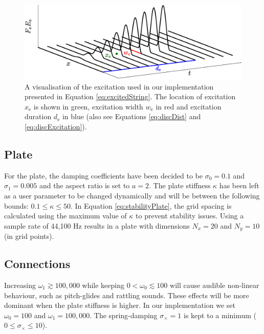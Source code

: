 \documentclass{article}
\begin{document}
\begin{figure}[h]
\centering
\includegraphics[width=1.0\columnwidth]{excitation.eps}
\caption{A visualisation of the excitation used in our implementation presented in Equation \eqref{eq:excitedString}. The location of excitation $x_\text{e}$ is shown in green, excitation width $w_\text{e}$ in red and excitation duration $d_\text{e}$ in blue (also see Equations \eqref{eq:discDist} and \eqref{eq:discExcitation}). \label{fig:exctiation}}
\end{figure}

\subsection{Plate}
For the plate, the damping coefficients have been decided to be $\sigma_0 = 0.1$ and $\sigma_1 = 0.005$ and the aspect ratio is set to $a = 2$. The plate stiffness $\kappa$ has been left as a user parameter to be changed dynamically and will be between the following bounds: $0.1 \leq \kappa \leq 50$. In Equation \eqref{eq:stabilityPlate}, the grid spacing is calculated using the maximum value of $\kappa$ to prevent stability issues. Using a sample rate of 44,100 Hz results in a plate with dimensions $N_x = 20$ and $N_y = 10$ (in grid points).

\subsection{Connections}
Increasing $\omega_1 \gtrsim 100,000$ while keeping $0 < \omega_0 \lesssim 100$ will cause audible non-linear behaviour, such as pitch-glides and rattling sounds. These effects will be more dominant when the plate stiffness is higher. %
In our implementation we set $\omega_0=100$ and $\omega_1 = 100,000$. The spring-damping $\sigma_\times = 1$ is kept to a minimum ($0 \leq \sigma_\times \leq 10$). 
\end{document}
